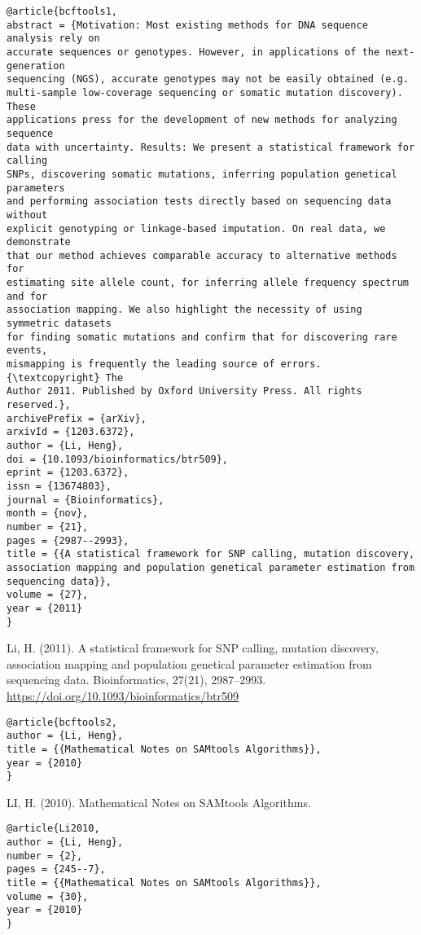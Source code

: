 \documentclass[]{article}
\begin{document}
\begin{verbatim}
@article{bcftools1,
abstract = {Motivation: Most existing methods for DNA sequence analysis rely on
accurate sequences or genotypes. However, in applications of the next-generation
sequencing (NGS), accurate genotypes may not be easily obtained (e.g.
multi-sample low-coverage sequencing or somatic mutation discovery). These
applications press for the development of new methods for analyzing sequence
data with uncertainty. Results: We present a statistical framework for calling
SNPs, discovering somatic mutations, inferring population genetical parameters
and performing association tests directly based on sequencing data without
explicit genotyping or linkage-based imputation. On real data, we demonstrate
that our method achieves comparable accuracy to alternative methods for
estimating site allele count, for inferring allele frequency spectrum and for
association mapping. We also highlight the necessity of using symmetric datasets
for finding somatic mutations and confirm that for discovering rare events,
mismapping is frequently the leading source of errors. {\textcopyright} The
Author 2011. Published by Oxford University Press. All rights reserved.},
archivePrefix = {arXiv},
arxivId = {1203.6372},
author = {Li, Heng},
doi = {10.1093/bioinformatics/btr509},
eprint = {1203.6372},
issn = {13674803},
journal = {Bioinformatics},
month = {nov},
number = {21},
pages = {2987--2993},
title = {{A statistical framework for SNP calling, mutation discovery,
association mapping and population genetical parameter estimation from
sequencing data}},
volume = {27},
year = {2011}
}
\end{verbatim}

Li, H. (2011). A statistical framework for SNP calling, mutation discovery, association mapping and population genetical parameter estimation from sequencing data. Bioinformatics, 27(21), 2987–2993. \url{https://doi.org/10.1093/bioinformatics/btr509}

\begin{verbatim}
@article{bcftools2,
author = {Li, Heng},
title = {{Mathematical Notes on SAMtools Algorithms}},
year = {2010}
}
\end{verbatim}

LI, H. (2010). Mathematical Notes on SAMtools Algorithms.

\begin{verbatim}
@article{Li2010,
author = {Li, Heng},
number = {2},
pages = {245--7},
title = {{Mathematical Notes on SAMtools Algorithms}},
volume = {30},
year = {2010}
}
\end{verbatim}
\end{document}
